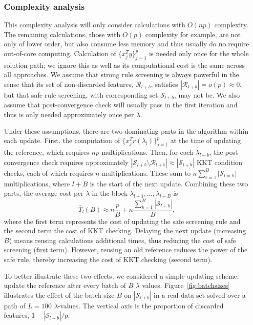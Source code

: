 \subsubsection{Complexity analysis}
\label{sec:complexity}

This complexity analysis will only consider calculations with $O(np)$ complexity. The remaining calculations, those with $O(p)$ complexity for example, are not only of lower order, but also consume less memory and thus usually do no require out-of-core computing. Calculation of $\{x_j^Ty\}_{j=1}^p$ is needed only once for the whole solution path; we ignore this as well as its computational cost is the same across all approaches. We assume that strong rule screening is always powerful in the sense that its set of non-discarded features, $\mathcal{R}_{l+b}$, satisfies $|\mathcal{R}_{l+b}|=o(p) \approx 0$, but that safe rule screening, with corresponding set $\mathcal{S}_{l+b}$, may not be. We also assume that post-convergence check will usually pass in the first iteration and thus is only needed approximately once per $\lambda$.

Under these assumptions, there are two dominating parts in the algorithm within each update. First, the computation of $\{x_j^Tr(\lambda_l)\}_{j=1}^p$ at the time of updating the reference, which requires $np$ multiplications. Then, for each $\lambda_{l+b}$, the post-convergence check requires approximately $|\mathcal{S}_{l+b} \setminus \mathcal{R}_{l+b}| \approx |\mathcal{S}_{l+b}|$ KKT condition checks, each of which requires $n$ multiplications. These sum to $n\sum_{b=1}^{B}|\mathcal{S}_{l=b}|$ multiplications, where $l+B$ is the start of the next update. Combining these two parts, the average cost per $\lambda$ in the block $\lambda_{l+1},...,\lambda_{l+B}$ is
\begin{equation}
    \label{eq:cost}
    \bar{T}_l(B) \approx n\frac{p}{B}+n\frac{\sum_{b=1}^B|\mathcal{S}_{l+b}|}{B},
\end{equation}
where the first term represents the cost of updating the safe screening rule and the second term the cost of KKT checking. Delaying the next update (increasing $B$) means reusing calculations additional times, thus reducing the cost of safe screening (first term). However, reusing an old reference reduces the power of the safe rule, thereby increasing the cost of KKT checking (second term).

To better illustrate these two effects, we considered a simple updating scheme: update the reference after every batch of $B$ $\lambda$ values. Figure~\ref{fig:batchsizes} illustrates the effect of the batch size $B$ on $|\mathcal{S}_{l+b}|$ in a real data set solved over a path of $L=100$ $\lambda$-values. The vertical axis is the proportion of discarded features, $1-|\mathcal{S}_{l+b}|/p$.

